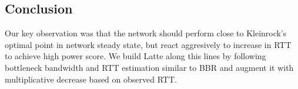 \documentclass{article}
\begin{document}
\subsection{Conclusion} Our key observation was that the network
should perform close to Kleinrock's optimal point in network steady
state, but react aggresively to increase in RTT to achieve high power
score. We build Latte along this lines by following bottleneck
bandwidth and RTT estimation similar to BBR and augment it with
multiplicative decrease based on observed RTT.



\end{document}
